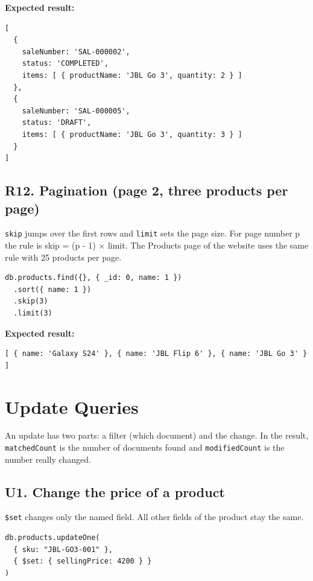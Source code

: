 \documentclass[11pt,a4paper]{article}
\newcommand{\code}[1]{\texttt{#1}}
\begin{document}
\noindent\textbf{Expected result:}
\begin{lstlisting}[style=result]
[
  {
    saleNumber: 'SAL-000002',
    status: 'COMPLETED',
    items: [ { productName: 'JBL Go 3', quantity: 2 } ]
  },
  {
    saleNumber: 'SAL-000005',
    status: 'DRAFT',
    items: [ { productName: 'JBL Go 3', quantity: 3 } ]
  }
]
\end{lstlisting}

\subsection*{R12. Pagination (page 2, three products per page)}
\code{skip} jumps over the first rows and \code{limit} sets the page size. For page number p the rule is skip = (p - 1) $\times$ limit. The Products page of the website uses the same rule with 25 products per page.

\begin{minipage}{\linewidth}
\begin{lstlisting}[style=query]
db.products.find({}, { _id: 0, name: 1 })
  .sort({ name: 1 })
  .skip(3)
  .limit(3)
\end{lstlisting}
\end{minipage}

\noindent\textbf{Expected result:}
\begin{lstlisting}[style=result]
[ { name: 'Galaxy S24' }, { name: 'JBL Flip 6' }, { name: 'JBL Go 3' } ]
\end{lstlisting}

\section{Update Queries}
An update has two parts: a filter (which document) and the change. In the result, \code{matchedCount} is the number of documents found and \code{modifiedCount} is the number really changed.

\subsection*{U1. Change the price of a product}
\code{\$set} changes only the named field. All other fields of the product stay the same.

\begin{minipage}{\linewidth}
\begin{lstlisting}[style=query]
db.products.updateOne(
  { sku: "JBL-GO3-001" },
  { $set: { sellingPrice: 4200 } }
)
\end{lstlisting}
\end{minipage}
\end{document}
